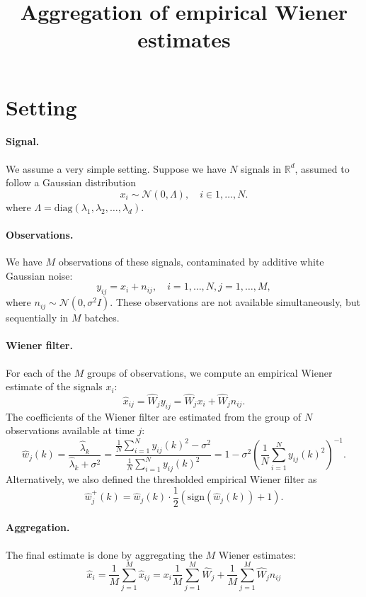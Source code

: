 \documentclass[a4paper,10pt]{article}
\title{Aggregation of empirical Wiener estimates}
\author{}
\date{}
\begin{document}
\maketitle

\section{Setting}

\paragraph{Signal.}We assume a very simple setting. Suppose we have $N$ signals in $\mathbb R^d$,
assumed to follow a Gaussian distribution
\[x_i\sim \mathcal N(0,\Lambda), \quad i\in1,\dots,N.\]
where $\Lambda =
\text{diag}(\lambda_1,\lambda_2,\dots,\lambda_d)$.

\paragraph{Observations.}We have $M$ observations of these signals, contaminated
by additive white Gaussian noise:
\[y_{ij} = x_i + n_{ij}, \quad i = 1,\dots,N, j = 1,\dots,M,\]
where $n_{ij}\sim \mathcal N(0,\sigma^2I)$.
These observations are not available simultaneously, but sequentially in $M$ batches.

\paragraph{Wiener filter.}For each of the $M$ groups of observations, we compute an empirical Wiener
estimate of the signals $x_i$:
\[\hat x_{ij} = \widehat W_jy_{ij} = \widehat W_j x_i + \widehat W_j n_{ij}.\]
The coefficients of the Wiener filter are estimated from the group of $N$ observations
available at time $j$:
\[\hat w_j(k) = \frac{\hat \lambda_k}{\hat \lambda_k + \sigma^2} =
\frac{\frac1N \sum_{i = 1}^N y_{ij}(k)^2 -\sigma^2}{\frac1N \sum_{i = 1}^N y_{ij}(k)^2} = 
1 - \sigma^2\left(\frac1N\sum_{i = 1}^N y_{ij}(k)^2\right)^{-1}.\]
Alternatively, we also defined the thresholded empirical Wiener filter
as 
\[\hat w_j^+(k) = \hat w_j(k) \cdot \frac12 (\text{sign}(\hat w_j(k)) + 1).\]

\paragraph{Aggregation.}The final estimate is done by aggregating the $M$
Wiener estimates:
\[\hat x_i = \frac1M \sum_{j = 1}^M \hat x_{ij} = x_i \frac1M \sum_{j = 1}^M
\widehat W_j + \frac1M \sum_{j = 1}^M \widehat W_jn_{ij}\]
\end{document}
